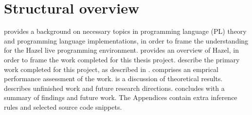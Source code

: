 \section{Structural overview}
\label{sec:structural_overview}

 provides a background on necessary topics in programming language (PL) theory and programming language implementations, in order to frame the understanding for the Hazel live programming environment.  provides an overview of Hazel, in order to frame the work completed for this thesis project.  describe the primary work completed for this project, as described in .  comprises an emprical performance assessment of the work.  is a discussion of theoretical results.  describes unfinished work and future research directions.  concludes with a summary of findings and future work. The Appendices contain extra inference rules and selected source code snippets.

